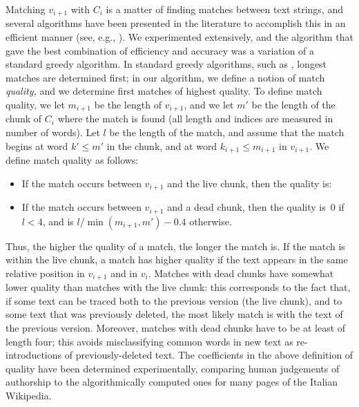 Matching $v_{i+1}$ with $C_i$ is a matter of finding matches between
text strings, and several algorithms have been presented in the
literature to accomplish this in an efficient manner
(see, e.g.,
\cite{HuntMcIlroy75,Hirchberg77,TichyEditDist,Myers86,BurnsLong97}).
We experimented extensively, and the algorithm that gave the best
combination of efficiency and accuracy was a variation of a standard
greedy algorithm.
In standard greedy algorithms, such as
\cite{Hirchberg77,Myers86,BurnsLong97}, longest matches are determined
first; in our algorithm, we define a notion of match {\em quality,}
and we determine first matches of highest quality.
To define match quality, we let $m_{i+1}$ be the length of $v_{i+1}$,
and we let $m'$ be the length of the chunk of $C_i$ where the match is
found (all length and indices are measured in number of words).
Let $l$ be the length of the match, and assume that the match begins
at word $k' \leq m'$ in the chunk, and at word $k_{i+1} \leq m_{i+1}$
in $v_{i+1}$.
We define match quality as follows:
%
\begin{itemize}
\item If the match occurs between $v_{i+1}$ and the live chunk, then
the quality is:
\item If the match occurs between $v_{i+1}$ and a dead chunk, then the
quality is~0 if $l < 4$, and is
$
  {l}/{\min(m_{i+1},m')} - 0.4
$ otherwise.
\end{itemize}
%
Thus, the higher the quality of a match, the longer the match is.
If the match is within the live chunk, a match has higher quality if the
text appears in the same relative position in $v_{i+1}$ and in $v_i$.
Matches with dead chunks have somewhat lower quality than matches with
the live chunk: this corresponds to the fact that, if some text can be
traced both to the previous version (the live chunk), and to some
text that was previously deleted, the most likely match is with the
text of the previous version.
Moreover, matches with dead chunks have to be at least of length four;
this avoids misclassifying common words in new text as re-introductions
of previously-deleted text.
The coefficients in the above definition of quality have been
determined experimentally, comparing human judgements of authorship to
the algorithmically computed ones for many pages of the Italian
Wikipedia.



